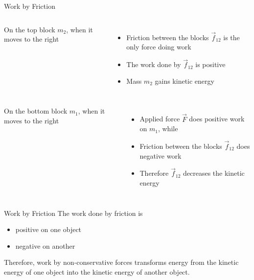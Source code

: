 \documentclass[12pt,compress,aspectratio=169]{beamer}
\begin{document}
\begin{frame}{Work by Friction}
  \begin{columns}
    \centering

    On the top block $m_2$, when it moves to the right
    \begin{itemize}
    \item Friction between the blocks $\vec f_{12}$ is the only force doing work
    \item The work done by $\vec f_{12}$ is positive
    \item Mass $m_2$ gains kinetic energy
    \end{itemize}
  \end{columns}
  \begin{columns}
    On the bottom block $m_1$, when it moves to the right
    \begin{itemize}
    \item Applied force $\vec F$ does positive work on $m_1$, while
    \item Friction between the blocks $\vec f_{12}$ does negative work
    \item Therefore $\vec f_{12}$ decreases the kinetic energy
    \end{itemize}
    
    \centering
  \end{columns}
\end{frame}



\begin{frame}{Work by Friction}
  The work done by friction is
  \begin{itemize}
  \item positive on one object
  \item negative on another
  \end{itemize}
  Therefore, work by non-conservative forces transforms energy from the kinetic
  energy of one object into the kinetic energy of another object.
\end{frame}
\end{document}
